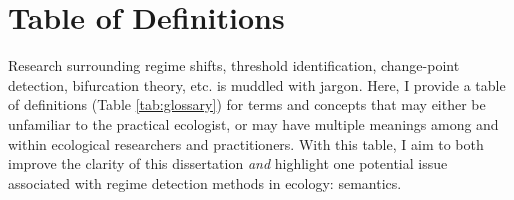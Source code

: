 \documentclass[12pt,twoside,openany]{reedthesis}
\begin{document}
\chapter*{Table of Definitions}\label{definitions}

Research surrounding regime shifts, threshold identification,
change-point detection, bifurcation theory, etc. is muddled with jargon.
Here, I provide a table of definitions (Table \ref{tab:glossary}) for
terms and concepts that may either be unfamiliar to the practical
ecologist, or may have multiple meanings among and within ecological
researchers and practitioners. With this table, I aim to both improve
the clarity of this dissertation \emph{and} highlight one potential
issue associated with regime detection methods in ecology: semantics.
\end{document}
